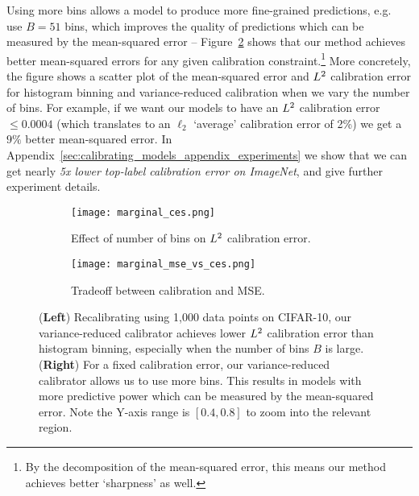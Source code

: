 Using more bins allows a model to produce more fine-grained predictions, e.g.~\cite{brocker2012empirical} use $B = 51$ bins, which improves the quality of predictions which can be measured by the mean-squared error -- Figure~\ref{fig:cifar_calibrator_cmp_mse_ce} shows that our method achieves better mean-squared errors for any given calibration constraint.\footnote{By the decomposition of the mean-squared error, this means our method achieves better `sharpness' as well.} More concretely, the figure shows a scatter plot of the mean-squared error and $L^2{}$ calibration error for histogram binning and variance-reduced calibration when we vary the number of bins. For example, if we want our models to have an $L^2{}$ calibration error $\leq 0.0004$ (which translates to an $\ell_2$ `average' calibration error of 2\%) we get a $9\%$ better mean-squared error. In Appendix~\ref{sec:calibrating_models_appendix_experiments} we show that we can get nearly \emph{5x lower top-label calibration error on ImageNet}, and give further experiment details.

\begin{figure}
  \centering
  \centering
     \begin{subfigure}[b]{0.54\textwidth}
         \centering
         \texttt{[image: marginal\_ces.png]}
         \caption{Effect of number of bins on $L^2{}$ calibration error.}
         \label{fig:marginal_calibrator_comparison_cifar}
     \end{subfigure}
     \hfill
     \begin{subfigure}[b]{0.44\textwidth}
         \centering
         \texttt{[image: marginal\_mse\_vs\_ces.png]}
         \caption{Tradeoff between calibration and MSE.}
         \label{fig:cifar_calibrator_cmp_mse_ce}
     \end{subfigure}
  \caption{
  (\textbf{Left}) Recalibrating using 1,000 data points on CIFAR-10, our variance-reduced calibrator achieves lower $L^2{}$ calibration error than histogram binning, especially when the number of bins $B$ is large.
  (\textbf{Right}) For a fixed calibration error, our variance-reduced calibrator allows us to use more bins. This results in models with more predictive power which can be measured by the mean-squared error. Note the Y-axis range is $[0.4, 0.8]$ to zoom into the relevant region.
  }
  \label{fig:nan2}
\end{figure}
